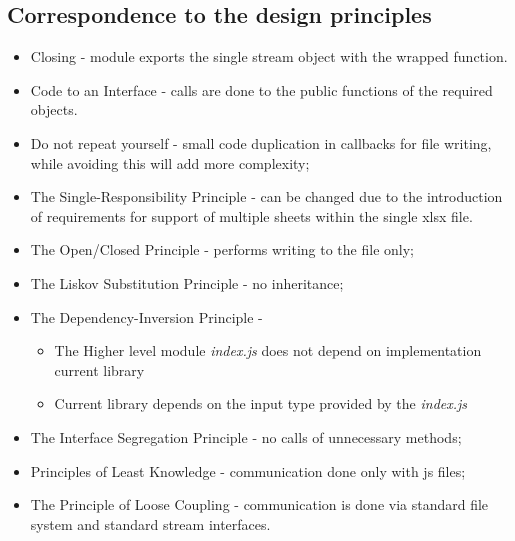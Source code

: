 {\subsection{Correspondence to the design principles}
\begin{itemize}
	\item Closing - module exports the single stream object with the wrapped function.
	\item Code to an Interface - calls are done to the public functions of the required objects. 
	\item Do not repeat yourself - small code duplication in callbacks for file writing, while avoiding this will add more complexity;
	\item The Single-Responsibility Principle - can be changed due to the introduction of requirements for support of multiple sheets within the single xlsx file.
	\item The Open/Closed Principle - performs writing to the file only;
	\item The Liskov Substitution Principle - no inheritance;
	\item The Dependency-Inversion Principle - 
	\begin{itemize}
		\item The Higher level module \textit{index.js} does not depend on implementation current library
		\item Current library depends on the input type provided by the \textit{index.js}
	\end{itemize}
	\item The Interface Segregation Principle - no calls of unnecessary methods;
	\item Principles of Least Knowledge - communication done only with js files;
	\item The Principle of Loose Coupling - communication is done via standard file system and standard stream interfaces.
\end{itemize}

}
